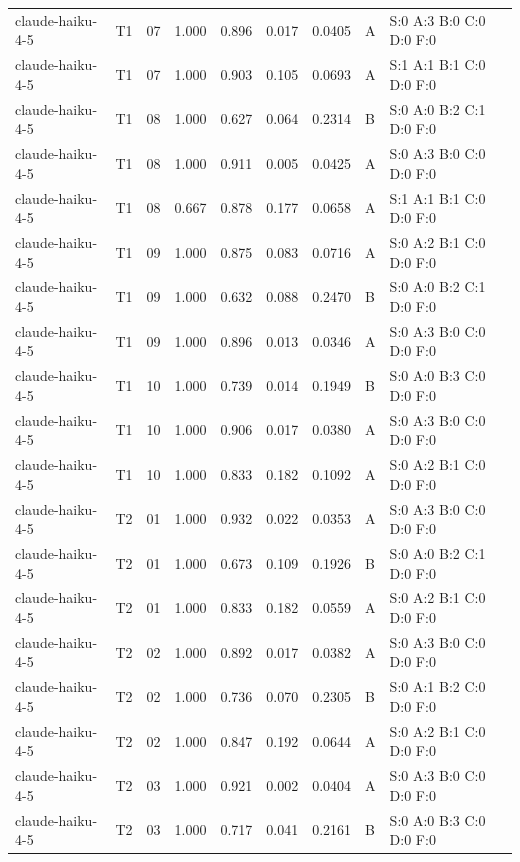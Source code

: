 \begin{longtable}{llrrrrrll}
claude-haiku-4-5 & T1 & 07 & 1.000 & 0.896 & 0.017 & 0.0405 & A & \tiny S:0 A:3 B:0 C:0 D:0 F:0 \\
claude-haiku-4-5 & T1 & 07 & 1.000 & 0.903 & 0.105 & 0.0693 & A & \tiny S:1 A:1 B:1 C:0 D:0 F:0 \\
claude-haiku-4-5 & T1 & 08 & 1.000 & 0.627 & 0.064 & 0.2314 & B & \tiny S:0 A:0 B:2 C:1 D:0 F:0 \\
claude-haiku-4-5 & T1 & 08 & 1.000 & 0.911 & 0.005 & 0.0425 & A & \tiny S:0 A:3 B:0 C:0 D:0 F:0 \\
claude-haiku-4-5 & T1 & 08 & 0.667 & 0.878 & 0.177 & 0.0658 & A & \tiny S:1 A:1 B:1 C:0 D:0 F:0 \\
claude-haiku-4-5 & T1 & 09 & 1.000 & 0.875 & 0.083 & 0.0716 & A & \tiny S:0 A:2 B:1 C:0 D:0 F:0 \\
claude-haiku-4-5 & T1 & 09 & 1.000 & 0.632 & 0.088 & 0.2470 & B & \tiny S:0 A:0 B:2 C:1 D:0 F:0 \\
claude-haiku-4-5 & T1 & 09 & 1.000 & 0.896 & 0.013 & 0.0346 & A & \tiny S:0 A:3 B:0 C:0 D:0 F:0 \\
claude-haiku-4-5 & T1 & 10 & 1.000 & 0.739 & 0.014 & 0.1949 & B & \tiny S:0 A:0 B:3 C:0 D:0 F:0 \\
claude-haiku-4-5 & T1 & 10 & 1.000 & 0.906 & 0.017 & 0.0380 & A & \tiny S:0 A:3 B:0 C:0 D:0 F:0 \\
claude-haiku-4-5 & T1 & 10 & 1.000 & 0.833 & 0.182 & 0.1092 & A & \tiny S:0 A:2 B:1 C:0 D:0 F:0 \\
claude-haiku-4-5 & T2 & 01 & 1.000 & 0.932 & 0.022 & 0.0353 & A & \tiny S:0 A:3 B:0 C:0 D:0 F:0 \\
claude-haiku-4-5 & T2 & 01 & 1.000 & 0.673 & 0.109 & 0.1926 & B & \tiny S:0 A:0 B:2 C:1 D:0 F:0 \\
claude-haiku-4-5 & T2 & 01 & 1.000 & 0.833 & 0.182 & 0.0559 & A & \tiny S:0 A:2 B:1 C:0 D:0 F:0 \\
claude-haiku-4-5 & T2 & 02 & 1.000 & 0.892 & 0.017 & 0.0382 & A & \tiny S:0 A:3 B:0 C:0 D:0 F:0 \\
claude-haiku-4-5 & T2 & 02 & 1.000 & 0.736 & 0.070 & 0.2305 & B & \tiny S:0 A:1 B:2 C:0 D:0 F:0 \\
claude-haiku-4-5 & T2 & 02 & 1.000 & 0.847 & 0.192 & 0.0644 & A & \tiny S:0 A:2 B:1 C:0 D:0 F:0 \\
claude-haiku-4-5 & T2 & 03 & 1.000 & 0.921 & 0.002 & 0.0404 & A & \tiny S:0 A:3 B:0 C:0 D:0 F:0 \\
claude-haiku-4-5 & T2 & 03 & 1.000 & 0.717 & 0.041 & 0.2161 & B & \tiny S:0 A:0 B:3 C:0 D:0 F:0 \\

\end{longtable}
